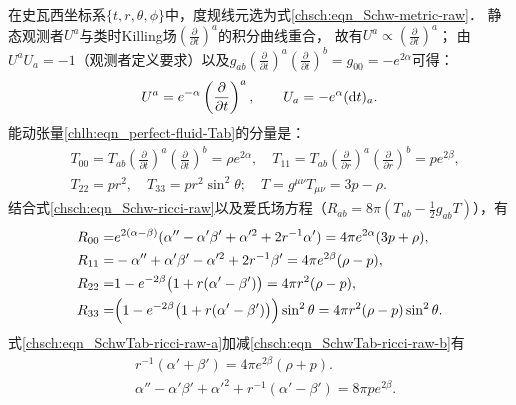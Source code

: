 在史瓦西坐标系$\{t,r,\theta,\phi\}$中，度规线元选为式\eqref{chsch:eqn_Schw-metric-raw}．
静态观测者$U^a$与类时Killing场$(\frac{\partial}{\partial t})^a$的积分曲线重合，
故有$U^a\propto (\frac{\partial}{\partial t})^a$；
由$U^aU_a=-1$（观测者定义要求）以及$g_{ab}(\frac{\partial}{\partial t})^a
(\frac{\partial}{\partial t})^b=g_{00}=-e^{2\alpha}$可得：
\begin{equation}
    U^a= e^{-\alpha} \left(\frac{\partial}{\partial t}\right)^a, \qquad
    U_a= -e^{\alpha} ({\rm d}t)_a .
\end{equation}
能动张量\eqref{chlh:eqn_perfect-fluid-Tab}的分量是：
\begin{equation}
\begin{aligned}
    &T_{00}= T_{ab} \left(\frac{\partial}{\partial t}\right)^a \left(\frac{\partial}{\partial t}\right)^b
    =\rho e^{2\alpha},\quad
    T_{11}=T_{ab} \left(\frac{\partial}{\partial r}\right)^a \left(\frac{\partial}{\partial r}\right)^b
    =p e^{2\beta}, \\
    &T_{22} = p r^2, \quad T_{33}=p r^2 \sin^2\theta;\quad
    T= g^{\mu\nu} T_{\mu\nu} = 3p-\rho.
\end{aligned}
\end{equation}
结合式\eqref{chsch:eqn_Schw-ricci-raw}以及爱氏场方程（$R_{ab} = 8\pi (T_{ab} - \frac{1}{2}g_{ab}T )$），有
\begin{subequations}\label{chsch:eqn_SchwTab-ricci-raw}
    \begin{align}
        R_{00} =&  e^{2(\alpha-\beta)} ( \alpha'' - \alpha'\beta' +\alpha'^2 +2 r^{-1} \alpha' ) 
        = 4\pi e^{2\alpha} (3p+\rho), \label{chsch:eqn_SchwTab-ricci-raw-a} \\
        R_{11} =& - \alpha'' + \alpha'\beta' -\alpha'^2  +2 r^{-1} \beta' 
          = 4\pi e^{2\beta}(\rho-p) , \label{chsch:eqn_SchwTab-ricci-raw-b} \\
        R_{22} =& 1 - e^{-2\beta} \bigl(1+ r(\alpha'-\beta')\bigr)
          = 4\pi r^2 (\rho-p), \label{chsch:eqn_SchwTab-ricci-raw-c} \\
        R_{33} =& \Bigl(1 - e^{-2\beta} \bigl(1+ r(\alpha'-\beta')\bigr)\Bigr)\sin^2\theta 
          = 4\pi r^2  (\rho-p) \sin^2\theta. 
    \end{align}
\end{subequations}
式\eqref{chsch:eqn_SchwTab-ricci-raw-a}加减\eqref{chsch:eqn_SchwTab-ricci-raw-b}有
\begin{align}
     & r^{-1} (\alpha'+\beta') = 4\pi e^{2\beta}(\rho+p) . \label{chsch:eqn_Schw-Tmp} \\
     & \alpha'' - \alpha'\beta' +\alpha'^2 + r^{-1} (\alpha'-\beta') 
     = 8\pi p e^{2\beta} . \label{chsch:eqn_Schw-T3}
\end{align}
